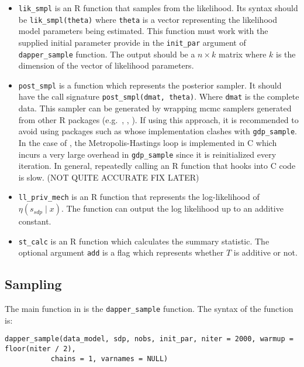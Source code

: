 \begin{itemize}
\item
  \texttt{lik\_smpl} is an R function that samples from the likelihood. Its
  syntax should be \texttt{lik\_smpl(theta)} where \texttt{theta} is a vector
  representing the likelihood model parameters being estimated. This function
  must work with the supplied initial parameter provide in the \texttt{init\_par}
  argument of \texttt{dapper\_sample} function. The output should be a \(n \times k\) matrix
  where \(k\) is the dimension of the vector of likelihood parameters.
\item
  \texttt{post\_smpl} is a function which represents the posterior sampler. It should
  have the call signature \texttt{post\_smpl(dmat,\ theta)}. Where \texttt{dmat} is the
  complete data. This sampler can be generated by wrapping mcmc samplers generated from other R packages
  (e.g.~, , ).
  If using this approach, it is recommended to avoid using packages such as 
  whose implementation clashes with \texttt{gdp\_sample}. In the case of ,
  the Metropolis-Hastings loop is implemented in C which incurs a very large overhead
  in \texttt{gdp\_sample} since it is reinitialized every iteration. In general, repeatedly calling
  an R function that hooks into C code is slow. (NOT QUITE ACCURATE FIX LATER)
\item
  \texttt{ll\_priv\_mech} is an R function that represents the log-likelihood of
  \(\eta(s_{sdp} \mid x)\). The function can output the log likelihood
  up to an additive constant.
\item
  \texttt{st\_calc} is an R function which calculates the summary statistic. The optional
  argument \texttt{add} is a flag which represents whether \(T\) is additive or not.
\end{itemize}

\hypertarget{sampling}{%
\subsection{Sampling}\label{sampling}}

The main function in  is the \texttt{dapper\_sample} function. The syntax of the function is:

\begin{verbatim}
dapper_sample(data_model, sdp, nobs, init_par, niter = 2000, warmup = floor(niter / 2),
           chains = 1, varnames = NULL)
\end{verbatim}

